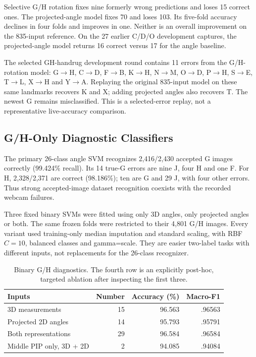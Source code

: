 Selective G/H rotation fixes nine formerly wrong predictions and loses 15 correct ones. The projected-angle model fixes 70 and loses 103. Its five-fold accuracy declines in four folds and improves in one. Neither is an overall improvement on the 835-input reference. On the 27 earlier C/D/O development captures, the projected-angle model returns 16 correct versus 17 for the angle baseline.

The selected GH-handrug development round contains 11 errors from the G/H-rotation model: G$\to$H, C$\to$D, F$\to$B, K$\to$H, N$\to$M, O$\to$D, P$\to$H, S$\to$E, T$\to$L, X$\to$H and Y$\to$A. Replaying the original 835-input model on these same landmarks recovers K and X; adding projected angles also recovers T. The newest G remains misclassified. This is a selected-error replay, not a representative live-accuracy comparison.

\subsection{G/H-Only Diagnostic Classifiers}
The primary 26-class angle SVM recognizes 2,416/2,430 accepted G images correctly (99.424\% recall). Its 14 true-G errors are nine J, four H and one F. For H, 2,328/2,371 are correct (98.186\%); ten are G and 29 J, with four other errors. Thus strong accepted-image dataset recognition coexists with the recorded webcam failures.

Three fixed binary SVMs were fitted using only 3D angles, only projected angles or both. The same frozen folds were restricted to their 4,801 G/H images. Every variant used training-only median imputation and standard scaling, with RBF $C=10$, balanced classes and gamma=scale. They are easier two-label tasks with different inputs, not replacements for the 26-class recognizer.

\begin{table}[h]\centering\caption{Binary G/H diagnostics. The fourth row is an explicitly post-hoc, targeted ablation after inspecting the first three.}
\begin{tabular}{lrrr}\toprule
Inputs & Number & Accuracy (\%) & Macro-F1\\\midrule
3D measurements & 15 & 96.563 & .96563\\
Projected 2D angles & 14 & 95.793 & .95791\\
Both representations & 29 & 96.584 & .96584\\
Middle PIP only, 3D + 2D & 2 & 94.085 & .94084\\\bottomrule\end{tabular}\end{table}

